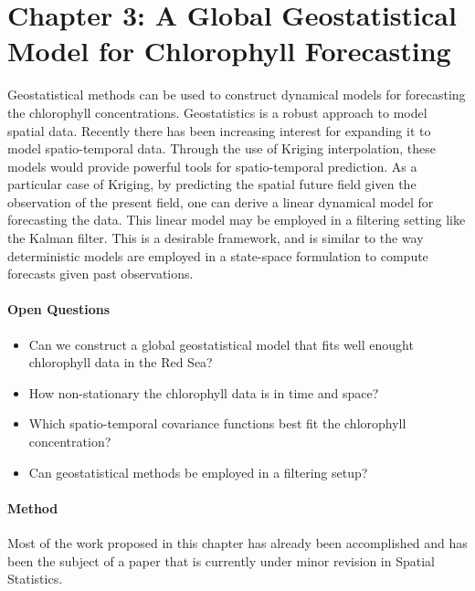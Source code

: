 \section{Chapter 3: A Global Geostatistical Model for Chlorophyll Forecasting}

Geostatistical methods can be used to construct dynamical models for
forecasting the chlorophyll concentrations. Geostatistics is a robust approach to
model spatial data.  Recently there has been increasing interest for expanding
it to model spatio-temporal data. Through the use of Kriging interpolation,
these models would provide powerful tools for spatio-temporal prediction. As a
particular case of Kriging, by predicting the spatial future field given the
observation of the present field, one can derive a linear dynamical model for
forecasting the data. This linear model may be employed in a filtering setting
like the Kalman filter. This is a desirable framework, and is similar to the
way deterministic models are employed in a state-space formulation
to compute forecasts given past
observations. 

\paragraph{Open Questions}

\begin{itemize}

\item Can we construct a global geostatistical model that fits well enought
chlorophyll data in the Red Sea?

\item How non-stationary the chlorophyll data is in time and space?

\item Which spatio-temporal covariance functions best fit the chlorophyll concentration?

\item Can geostatistical methods be employed in a filtering setup?

\end{itemize}

\paragraph{Method} 
\mbox{}

Most of the work proposed in this chapter has already been accomplished and has
been the subject of a paper that is currently under minor revision in Spatial 
Statistics.

